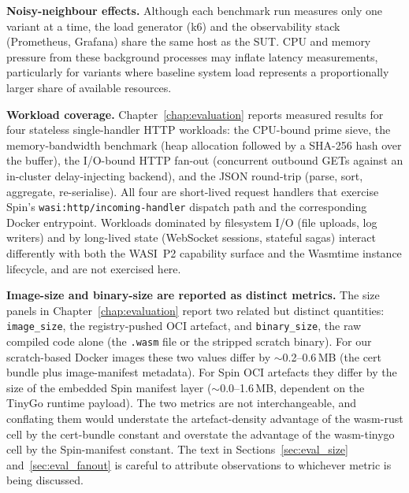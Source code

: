 \textbf{Noisy-neighbour effects.} Although each benchmark run measures only one variant at a time, the load generator (k6) and the observability stack (Prometheus, Grafana) share the same host as the \acs{SUT}. \acs{CPU} and memory pressure from these background processes may inflate latency measurements, particularly for variants where baseline system load represents a proportionally larger share of available resources.

\begin{sloppypar}
\textbf{Workload coverage.} Chapter~\ref{chap:evaluation} reports measured results for four stateless single-handler \acs{HTTP} workloads: the \acs{CPU}-bound prime sieve, the memory-bandwidth benchmark (heap allocation followed by a SHA-256 hash over the buffer), the I/O-bound HTTP fan-out (concurrent outbound GETs against an in-cluster delay-injecting backend), and the JSON round-trip (parse, sort, aggregate, re-serialise). All four are short-lived request handlers that exercise Spin's \texttt{wasi:http/incoming-handler} dispatch path and the corresponding Docker entrypoint. Workloads dominated by filesystem I/O (file uploads, log writers) and by long-lived state (WebSocket sessions, stateful sagas) interact differently with both the \acs{WASI}~P2 capability surface and the Wasmtime instance lifecycle, and are not exercised here.
\end{sloppypar}

\begin{sloppypar}
\textbf{Image-size and binary-size are reported as distinct metrics.} The size panels in Chapter~\ref{chap:evaluation} report two related but distinct quantities: \texttt{image\_size}, the registry-pushed \acs{OCI} artefact, and \texttt{binary\_size}, the raw compiled code alone (the \texttt{.wasm} file or the stripped scratch binary). For our scratch-based Docker images these two values differ by $\sim$0.2--0.6\,\acs{MB} (the cert bundle plus image-manifest metadata). For Spin \acs{OCI} artefacts they differ by the size of the embedded Spin manifest layer ($\sim$0.0--1.6\,\acs{MB}, dependent on the TinyGo runtime payload). The two metrics are not interchangeable, and conflating them would understate the artefact-density advantage of the wasm-rust cell by the cert-bundle constant and overstate the advantage of the wasm-tinygo cell by the Spin-manifest constant. The text in Sections~\ref{sec:eval_size} and~\ref{sec:eval_fanout} is careful to attribute observations to whichever metric is being discussed.
\end{sloppypar}

